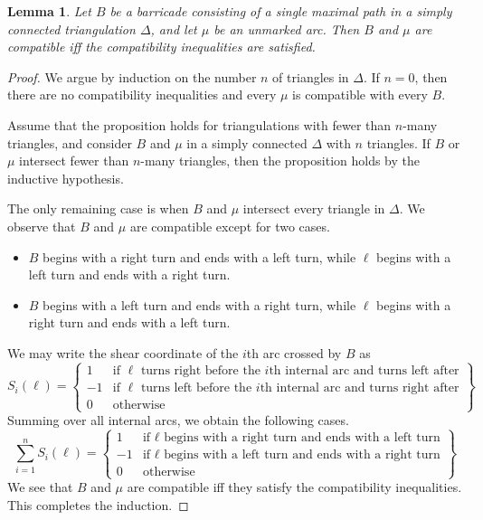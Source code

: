 \documentclass{amsart}
\newtheorem{lemma}[proposition]{Lemma}
\theoremstyle{definition}
\theoremstyle{remark}
\numberwithin{equation}{section}
\newcommand{\0}{{\mathbf{0}}}
\begin{document}
\begin{lemma}
Let $B$ be a barricade consisting of a single maximal path in a simply connected triangulation $\Delta$, and let $\mu$ be an unmarked arc. Then $B$ and $\mu$ are compatible iff the compatibility inequalities are satisfied.
\end{lemma}
\begin{proof}
We argue by induction on the number $n$ of triangles in $\Delta$. If $n=0$, then there are no compatibility inequalities and every $\mu$ is compatible with every $B$. 

Assume that the proposition holds for triangulations with fewer than $n$-many triangles, and consider $B$ and $\mu$ in a simply connected $\Delta$ with $n$ triangles. If $B$ or $\mu$ intersect fewer than $n$-many triangles, then the proposition holds by the inductive hypothesis. 

The only remaining case is when $B$ and $\mu$ intersect every triangle in $\Delta$. We observe that $B$ and $\mu$ are compatible except for two cases.
\begin{itemize}
	\item $B$ begins with a right turn and ends with a left turn, while $\ell$ begins with a left turn and ends with a right turn.
	\item $B$ begins with a left turn and ends with a right turn, while $\ell$ begins with a right turn and ends with a left turn.
\end{itemize}
We may write the shear coordinate of the $i$th arc crossed by $B$ as
\[ S_i (\ell) = \left\{ \begin{array}{cc}
1 & \text{if $\ell$ turns right before the $i$th internal arc and turns left after} \\
-1 & \text{if $\ell$ turns left before the $i$th internal arc and turns right after} \\
0 & \text{otherwise}
\end{array}\right\}\]
Summing over all internal arcs, we obtain the following cases.
\[ \sum_{i=1}^nS_i (\ell) = \left\{ \begin{array}{cc}
1 & \text{if $\ell$ begins with a right turn and ends with a left turn} \\
-1 & \text{if $\ell$ begins with a left turn and ends with a right turn} \\
0 & \text{otherwise}
\end{array}\right\}\]
We see that $B$ and $\mu$ are compatible iff they satisfy the compatibility inequalities. This completes the induction.
\end{proof}
\end{document}
